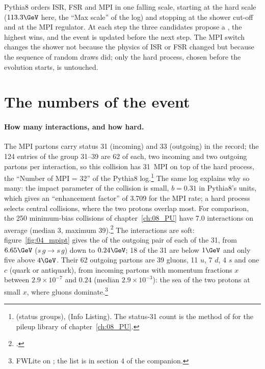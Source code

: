 \begin{plainwords}
Pythia8 orders ISR, FSR and MPI in one falling \pt{} scale, starting at the hard scale ($113.3\GeV$ here, the
``Max \pt{} scale'' of the log) and stopping at the shower cut-off and at the MPI regulator. At each step the
three candidates propose a \pt, the highest wins, and the event is updated before the next step. The MPI
switch changes the shower not because the physics of ISR or FSR changed but because the sequence of random draws
did; only the hard process, chosen before the evolution starts, is untouched.
\end{plainwords}

\section{The numbers of the event}

\paragraph{How many interactions, and how hard.}
The MPI partons carry status 31 (incoming) and 33 (outgoing) in the record; the 124 entries of the group
31--39 are 62 of each, two incoming and two outgoing partons per interaction, so this collision has 31~MPI on top
of the hard process, the ``Number of MPI = 32'' of the Pythia8 log.\footnote{ (status
groups),  (Info Listing). The status-31 count is the method of
 for the pileup library of chapter~\ref{ch:08_PU}.} The same log explains
why so many: the impact parameter of the collision is small, $b=0.31$ in Pythia8's units, which gives an
``enhancement factor'' of 3.709 for the MPI rate; a hard process selects central collisions, where the two
protons overlap most. For comparison, the 250 minimum-bias collisions of chapter~\ref{ch:08_PU} have 7.0
interactions on average (median 3, maximum 39).\footnote{.} The
interactions are soft: figure~\ref{fig:04_mpipt} gives the \pt{} of the outgoing pair of each of the 31, from
$6.65\GeV$ ($s\,g\to s\,g$) down to $0.24\GeV$; 18 of the 31 are below $1\GeV$ and only five above $4\GeV$.
Their 62 outgoing partons are 39 gluons, 11 $u$, 7 $d$, 4 $s$ and one $c$ (quark or antiquark), from incoming
partons with momentum fractions $x$ between $2.9\times10^{-7}$ and $0.24$ (median $2.9\times10^{-3}$): the
sea of the two protons at small $x$, where gluons dominate.\footnote{FWLite on ;
the list is in section 4 of the companion.}

